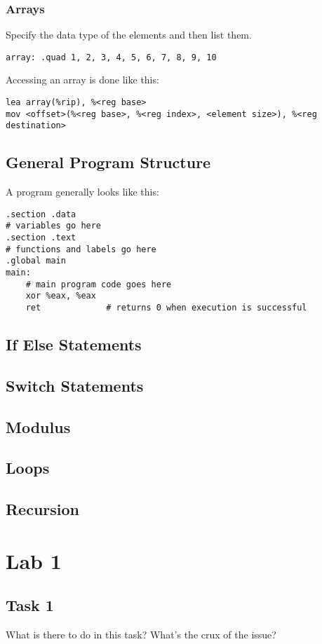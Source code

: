\documentclass[reqno,a4paper,11pt]{amsart}
\begin{document}
\subsubsection{Arrays}
Specify the data type of the elements and then list them.
\begin{lstlisting}
array: .quad 1, 2, 3, 4, 5, 6, 7, 8, 9, 10
\end{lstlisting}
Accessing an array is done like this:
\begin{lstlisting}
lea array(%rip), %<reg base>
mov <offset>(%<reg base>, %<reg index>, <element size>), %<reg destination>
\end{lstlisting}
\subsection{General Program Structure}
A program generally looks like this:
\begin{lstlisting}
.section .data
# variables go here
.section .text
# functions and labels go here
.global main
main:
    # main program code goes here
    xor %eax, %eax
    ret             # returns 0 when execution is successful
\end{lstlisting}
\subsection{If Else Statements}

\subsection{Switch Statements}

\subsection{Modulus}

\subsection{Loops}

\subsection{Recursion}

\section{Lab 1}

\subsection{Task 1}

What is there to do in this task? What's the crux of the issue?
\end{document}
